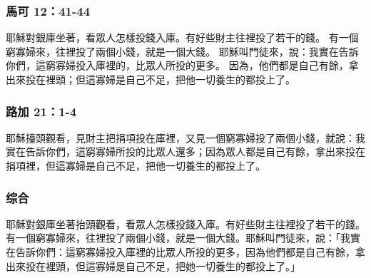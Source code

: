\subsubsection{馬可 12：41-44}
耶穌對銀庫坐著，看眾人怎樣投錢入庫。有好些財主往裡投了若干的錢。
有一個窮寡婦來，往裡投了兩個小錢，就是一個大錢。
耶穌叫門徒來，說：我實在告訴你們，這窮寡婦投入庫裡的，比眾人所投的更多。
因為，他們都是自己有餘，拿出來投在裡頭；但這寡婦是自己不足，把他一切養生的都投上了。
\subsubsection{路加 21：1-4}
耶穌擡頭觀看，見財主把捐項投在庫裡，又見一個窮寡婦投了兩個小錢，就說：我實在告訴你們，這窮寡婦所投的比眾人還多；因為眾人都是自己有餘，拿出來投在捐項裡，但這寡婦是自己不足，把他一切養生的都投上了。
\subsubsection{综合}
耶穌對銀庫坐著抬頭觀看，看眾人怎樣投錢入庫。有好些財主往裡投了若干的錢。有一個窮寡婦來，往裡投了兩個小錢，就是一個大錢。耶穌叫門徒來，說：「我實在告訴你們：這窮寡婦投入庫裡的比眾人所投的更多，因為他們都是自己有餘，拿出來投在裡頭，但這寡婦是自己不足，把她一切養生的都投上了。」
